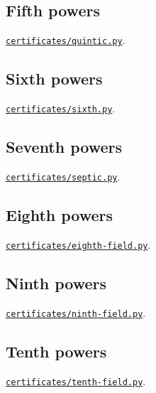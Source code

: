 \documentclass[11pt]{amsart}
\theoremstyle{definition}
\numberwithin{equation}{section}
\begin{document}
\subsection{Fifth powers}\label{app:quintic}
\href{https://github.com/morley988/warings-problem/blob/3752a566d4ae778c3f2effaeb7caec4fc8899514/supplements/number-field/small-powers/certificates/quintic.py}{\texttt{certificates/quintic.py}}.

\subsection{Sixth powers}\label{app:sixth}
\href{https://github.com/morley988/warings-problem/blob/3752a566d4ae778c3f2effaeb7caec4fc8899514/supplements/number-field/small-powers/certificates/sixth.py}{\texttt{certificates/sixth.py}}.

\subsection{Seventh powers}\label{app:septic}
\href{https://github.com/morley988/warings-problem/blob/3752a566d4ae778c3f2effaeb7caec4fc8899514/supplements/number-field/small-powers/certificates/septic.py}{\texttt{certificates/septic.py}}.

\subsection{Eighth powers}\label{app:eighth-field}
\href{https://github.com/morley988/warings-problem/blob/3752a566d4ae778c3f2effaeb7caec4fc8899514/supplements/number-field/small-powers/certificates/eighth-field.py}{\texttt{certificates/eighth-field.py}}.

\subsection{Ninth powers}\label{app:ninth-field}
\href{https://github.com/morley988/warings-problem/blob/3752a566d4ae778c3f2effaeb7caec4fc8899514/supplements/number-field/small-powers/certificates/ninth-field.py}{\texttt{certificates/ninth-field.py}}.

\subsection{Tenth powers}\label{app:tenth-field}
\href{https://github.com/morley988/warings-problem/blob/3752a566d4ae778c3f2effaeb7caec4fc8899514/supplements/number-field/small-powers/certificates/tenth-field.py}{\texttt{certificates/tenth-field.py}}.
\end{document}
